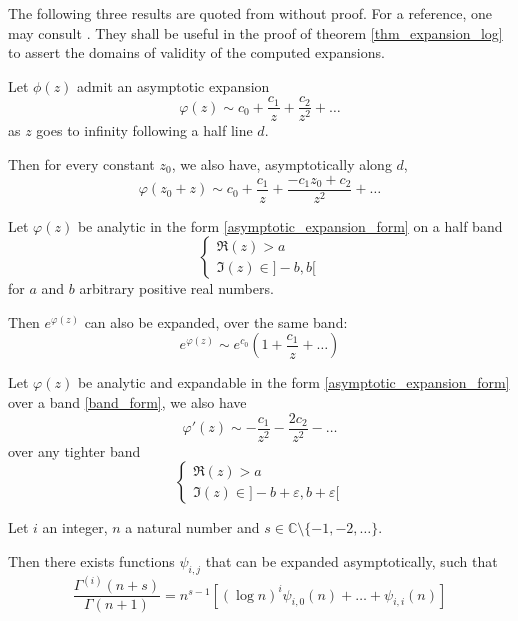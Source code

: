 \documentclass[../main.tex]{subfiles}
\begin{document}
The following three results are quoted from \cite{Jungen1931} without proof. For a reference, one may consult \cite{knopp1928}. They shall be useful in the proof of theorem \ref{thm_expansion_log} to assert the domains of validity of the computed expansions.

\begin{lemma}{}\label{jungen_lemma_1}
	Let $\phi(z)$ admit an asymptotic expansion
	\begin{equation}\label{asymptotic_expansion_form}
	\varphi(z) \sim c_0 + \frac{c_1}{z} + \frac{c_2}{z^2} + \dots
	\end{equation}
	as $z$ goes to infinity following a half line $d$.
	
	Then for every constant $z_0$, we also have, asymptotically along $d$,
	\[
	\varphi(z_0 + z) \sim c_0 + \frac{c_1}{z} + \frac{-c_1 z_0 + c_2}{z^2} + \dots
	\]
\end{lemma}

\begin{lemma}{}\label{jungen_lemma_2}
	Let $\varphi(z)$ be analytic in the form \eqref{asymptotic_expansion_form} on a half band
	\begin{equation}\label{band_form}
	\begin{cases}
	\Re(z) > a\\
	\Im(z) \in ]-b, b[
	\end{cases}
	\end{equation}
	for $a$ and $b$ arbitrary positive real numbers.
	
	Then $e^{\varphi(z)}$ can also be expanded, over the same band:
	\[
	e^{\varphi(z)} \sim e^{c_0} \left(1 + \frac{c_1}{z} + \dots\right)
	\]
\end{lemma}

\begin{lemma}{}\label{jungen_lemma_3}
	Let $\varphi(z)$ be analytic and expandable in the form \eqref{asymptotic_expansion_form} over a band \eqref{band_form}, we also have
	\[
	\varphi'(z) \sim -\frac{c_1}{z^2} - \frac{2c_2}{z^2} - \dots
	\]
	over any tighter band
	\begin{equation}
	\begin{cases}
	\Re(z) > a\\
	\Im(z) \in ]-b + \varepsilon, b + \varepsilon[
	\end{cases}
	\end{equation}
\end{lemma}

\begin{lemma}{}\label{lemma_quotient_gamma}
	Let $i$ an integer, $n$ a natural number and $s \in \mathbb{C} \setminus \{-1, -2, \dots\}$.
	
	Then there exists functions $\psi_{i, j}$ that can be expanded asymptotically, such that
	\begin{equation}
	\frac{\Gamma^{(i)}(n+s)}{\Gamma(n + 1)} = n^{s-1} [{(\log n)}^i \psi_{i, 0}(n) + \dots + \psi_{i, i}(n)]
	\end{equation}
\end{lemma}
\end{document}
